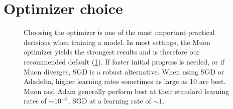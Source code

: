 \section{Optimizer choice}
\label{sec:exp-memory-optimizer}
\begin{figure}[ht]
\centering
\begin{minipage}[]{0.48\textwidth}
    Choosing the optimizer is one of the most important practical decisions when training a model. In most settings, the Muon optimizer yields the strongest results and is therefore our recommended default (\cref{fig:optimizer-comparison}). If faster initial progress is needed, or if Muon diverges, SGD is a robust alternative. When using SGD or Adadelta, higher learning rates sometimes as large as 10 are best. Muon and Adam generally perform best at their standard learning rates of $\sim10^{-3}$, SGD at a learning rate of $\sim1$.
\end{minipage}
\hfill
\begin{minipage}[]{0.48\textwidth}
    \centering
    \label{fig:optimizer-comparison}
\end{minipage}
\end{figure}
